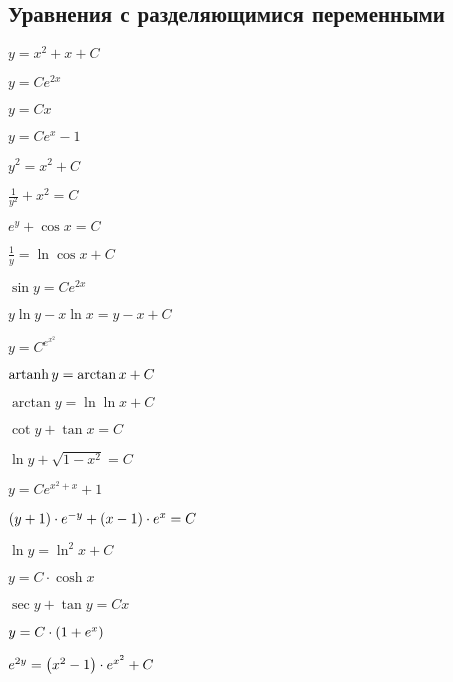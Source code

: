 \subsection*{Уравнения с разделяющимися переменными}

	\label{sol:firstorder:separable}
	\begin{enumsols}
		
		\item \( y = x^2 + x + C \) %
		\item \( y = C e^{2x} \) %
		\item \( y = Cx \) %
		\item \( y = Ce^{x} - 1  \) %
		\item \( y^2 = x^2 + C \) %
		\item \( \frac{1}{y^2} + x^2 = C \) %
		\item \( e^y + \cos{x} = C \) %
		\item \( \frac{1}{y} = \ln{\cos{x}} + C \) %
		\item \( \sin{y} = Ce^{2x} \) %
		\item \( y \ln{y} - x \ln{x} = y - x + C \) %
		\item \( y = C^{e^{x^2}} \) %
		\item \( \operatorname{artanh}{y} = \arctan{x} + C \) %
		\item \( \arctan{y} = \ln{\ln{x}} + C \) %
		\item \( \cot{y} + \tan{x} = C \) %
		\item \( \ln{y} + \sqrt{1 - x^2} = C \) %
		\item \( y = Ce^{x^2 + x} + 1 \) %
		\item \( \left( y + 1 \right) \cdot e^{-y} + \left( x - 1 \right) \cdot e^{x} = C \) %
		\item \( \ln{y} = \ln^2{x} + C \) %
		\item \( y = C \cdot \cosh{x} \) %
		\item \( \sec{y} + \tan{y} = Cx \) %
		\item \( y = C \cdot \left( 1 + e^{x} \right) \) %
		\item \( e^{2y} = \left( x^2 - 1 \right) \cdot e^{x^2} + C \) %

\end{enumsols}
